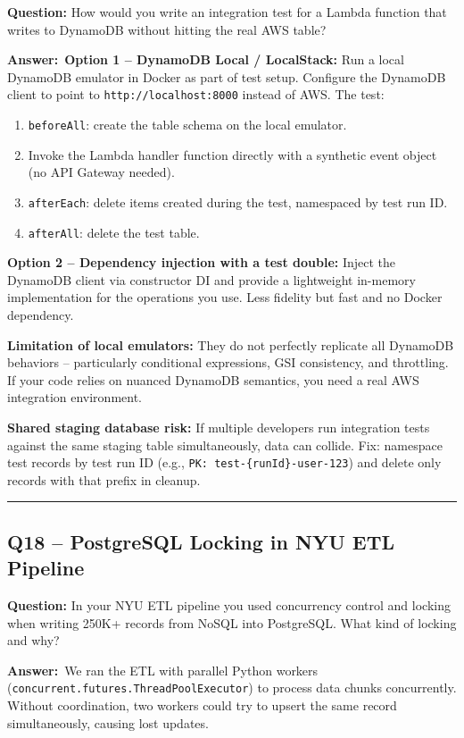 \documentclass[letterpaper,10pt]{article}
\newlength{\boxwidth}
\newcommand{\questionbox}[1]{%
  \vspace{6pt}%
  \noindent\colorbox{qbg}{%
    \begin{minipage}{\boxwidth}%
      \vspace{3pt}\textbf{\textcolor{nordblue}{Question:}} #1\vspace{3pt}%
    \end{minipage}%
  }\vspace{2pt}%
}
\newcommand{\answerlabel}{\noindent\textbf{\textcolor{answerblue}{Answer:}}~}
\begin{document}
\questionbox{How would you write an integration test for a Lambda function that writes to DynamoDB without hitting the real AWS table?}

\answerlabel \textbf{Option 1 -- DynamoDB Local / LocalStack:} Run a local DynamoDB emulator in Docker as part of test setup. Configure the DynamoDB client to point to \texttt{http://localhost:8000} instead of AWS. The test:
\begin{enumerate}[leftmargin=*, itemsep=0pt]
  \item \texttt{beforeAll}: create the table schema on the local emulator.
  \item Invoke the Lambda handler function directly with a synthetic event object (no API Gateway needed).
  \item \texttt{afterEach}: delete items created during the test, namespaced by test run ID.
  \item \texttt{afterAll}: delete the test table.
\end{enumerate}

\textbf{Option 2 -- Dependency injection with a test double:} Inject the DynamoDB client via constructor DI and provide a lightweight in-memory implementation for the operations you use. Less fidelity but fast and no Docker dependency.

\textbf{Limitation of local emulators:} They do not perfectly replicate all DynamoDB behaviors -- particularly conditional expressions, GSI consistency, and throttling. If your code relies on nuanced DynamoDB semantics, you need a real AWS integration environment.

\textbf{Shared staging database risk:} If multiple developers run integration tests against the same staging table simultaneously, data can collide. Fix: namespace test records by test run ID (e.g., \texttt{PK: test-\{runId\}-user-123}) and delete only records with that prefix in cleanup.

\medskip\rule{\linewidth}{0.2pt}

\subsection*{Q18 -- PostgreSQL Locking in NYU ETL Pipeline}

\questionbox{In your NYU ETL pipeline you used concurrency control and locking when writing 250K+ records from NoSQL into PostgreSQL. What kind of locking and why?}

\answerlabel We ran the ETL with parallel Python workers (\texttt{concurrent.futures.ThreadPoolExecutor}) to process data chunks concurrently. Without coordination, two workers could try to upsert the same record simultaneously, causing lost updates.
\end{document}
